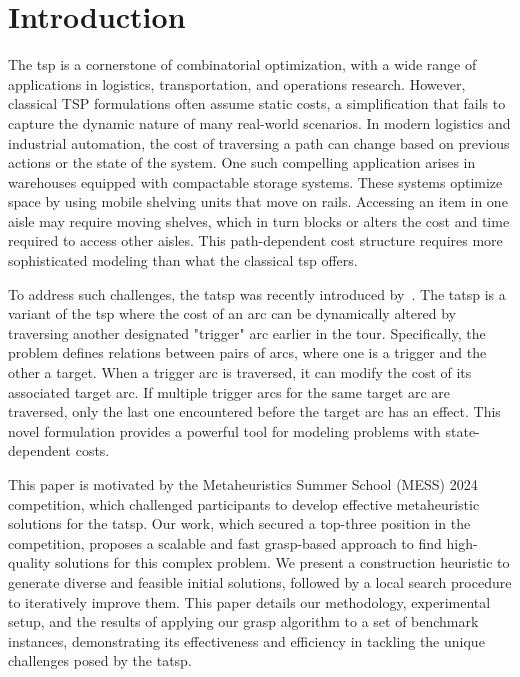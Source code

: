 \documentclass[twocolumn, switch]{article} %
\begin{document}
\section{Introduction}
The \gls{tsp} is a cornerstone of combinatorial optimization, with a wide range of applications in logistics, transportation, and operations research. 
However, classical TSP formulations often assume static costs, a simplification that fails to capture the dynamic nature of many real-world scenarios. 
In modern logistics and industrial automation, the cost of traversing a path can change based on previous actions or the state of the system. 
One such compelling application arises in warehouses equipped with compactable storage systems. 
These systems optimize space by using mobile shelving units that move on rails. 
Accessing an item in one aisle may require moving shelves, which in turn blocks or alters the cost and time required to access other aisles. 
This path-dependent cost structure requires more sophisticated modeling than what the classical \gls{tsp} offers. 

To address such challenges, the \gls{tatsp} was recently introduced by~\citet{Cerrone}. 
The \gls{tatsp} is a variant of the \gls{tsp} where the cost of an arc can be dynamically altered by traversing another designated "trigger" arc earlier in the tour. 
Specifically, the problem defines relations between pairs of arcs, where one is a trigger and the other a target. 
When a trigger arc is traversed, it can modify the cost of its associated target arc. 
If multiple trigger arcs for the same target arc are traversed, only the last one encountered before the target arc has an effect. 
This novel formulation provides a powerful tool for modeling problems with state-dependent costs. 

This paper is motivated by the Metaheuristics Summer School (MESS) 2024 competition, which challenged participants to develop effective metaheuristic solutions for the \gls{tatsp}. 
Our work, which secured a top-three position in the competition, proposes a scalable and fast \gls{grasp}-based approach to find high-quality solutions for this complex problem. 
We present a construction heuristic to generate diverse and feasible initial solutions, followed by a local search procedure to iteratively improve them. 
This paper details our methodology, experimental setup, and the results of applying our \gls{grasp} algorithm to a set of benchmark instances, demonstrating its effectiveness and efficiency in tackling the unique challenges posed by the \gls{tatsp}. 
\end{document}
